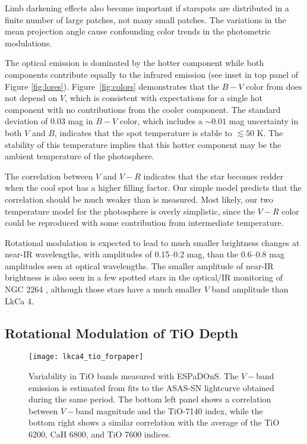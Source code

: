 \documentclass[twocolumn]{emulateapj}%
\begin{document}
Limb darkening effects also become important if starspots are distributed in a finite number of large patches, not many small patches.  The variations in the mean projection angle cause confounding color trends in the photometric modulations.

The optical emission is dominated by the hotter component while both components contribute equally to the infrared emission (see inset in top panel of Figure \ref{fig:lores}).  Figure~\ref{fig:colors} demonstrates that the $B-V$ color from \citet{grankin08} does not depend on $V$, which is consistent with expectations for a single hot component with no contributions from the cooler component.  The standard deviation of 0.03 mag in $B-V$ color, which includes a $\sim 0.01$ mag uncertainty in both $V$ and $B$, indicates that the spot temperature is stable to $\lesssim 50$ K.  The stability of this temperature implies that this hotter component may be the ambient temperature of the photosphere.

The correlation between $V$ and $V-R$ indicates that the star becomes redder when the cool spot has a higher filling factor.  Our simple model predicts that the correlation should be much weaker than is measured.  Most likely, our two temperature model for the photosphere is overly simplistic, since the $V-R$ color could be reproduced with some contribution from intermediate temperature.

Rotational modulation is expected to lead to much smaller brightness changes at near-IR wavelengths, with amplitudes of 0.15--0.2 mag, than the 0.6--0.8 mag amplitudes seen at optical wavelengths.  The smaller amplitude of near-IR brightness is also seen in a few spotted stars in the optical/IR monitoring of NGC 2264 \citep{cody14}, although those stars have a much smaller $V$ band amplitude than LkCa 4.


\subsection{Rotational Modulation of TiO Depth}\label{sec:RotTiO}

\begin{figure*}
 \centering
 \texttt{[image: lkca4\_tio\_forpaper]}
 \caption{Variability in TiO bands measured with ESPaDOnS.  The $V-$band emission is estimated from fits to the ASAS-SN lightcurve obtained during the same period.  The bottom left panel shows a correlation between $V-$band magnitude and the TiO-7140 index, while the bottom right shows a similar correlation with the average of the TiO 6200, CaH 6800, and TiO 7600 indices.}
 \label{fig:tiovar}
\end{figure*}
\end{document}
